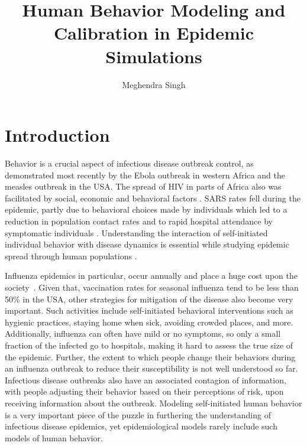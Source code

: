\documentclass[doublespace,draft]{VTthesis}
\title{Human Behavior Modeling and Calibration in Epidemic Simulations}
\author{Meghendra Singh}
\begin{document}
  \frontmatter
  \maketitle
  \tableofcontents

	\listoffigures
	\listoftables

	\mainmatter

	\chapter{Introduction} \label{ch:introduction}
	Behavior is a crucial aspect of infectious disease outbreak control, as demonstrated most recently by the Ebola outbreak in western Africa and the measles outbreak in the USA. The spread of HIV in parts of Africa also was facilitated by social, economic and behavioral factors \cite{ezzell2000care}. SARS rates fell during the epidemic, partly due to behavioral choices made by individuals which led to a reduction in population contact rates and to rapid hospital attendance by symptomatic individuals \cite{riley2003transmission}. Understanding the interaction of self-initiated individual behavior with disease dynamics is essential while studying epidemic spread through human populations \cite{ferguson2007capturing}. 

    Influenza epidemics in particular, occur annually and place a huge cost upon the society~\cite{meltzer99economic}. Given that, vaccination rates for seasonal influenza tend to be less than 50\% in the USA, other strategies for mitigation of the disease also become very important. Such activities include self-initiated behavioral interventions such as hygienic practices, staying home when sick, avoiding crowded places, and more. Additionally, influenza can often have mild or no symptoms, so only a small fraction of the infected go to hospitals, making it hard to assess the true size of the epidemic. Further, the extent to which people change their behaviors during an influenza outbreak to reduce their susceptibility is not well understood so far. Infectious disease outbreaks also have an associated contagion of information, with people adjusting their behavior based on their perceptions of risk, upon receiving information about the outbreak. Modeling self-initiated human behavior is a very important piece of the puzzle in furthering the understanding of infectious disease epidemics, yet epidemiological models rarely include such models of human behavior. 
    
\end{document}
